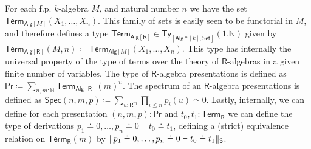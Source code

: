 \documentclass[10pt,a4paper]{article}
\newcommand{\nats}{\mathbb{N}}
\newcommand{\Set}{\mathsf{Set}}
\newcommand{\Alg}{\mathsf{Alg}}
\newcommand\Ty{\mathsf{Ty}}
\newcommand\R{\mathsf{R}}
\newcommand\Spec{\mathsf{Spec}}
\renewcommand\Pr{\mathsf{Pr}}
\newcommand\Term{\mathsf{Term}}
\begin{document}
For each f.p. \(k\)-algebra \(M\), and natural number \(n\) we have the set \(\Term_{\Alg[M]}(X_1, \ldots, X_n)\).
This family of sets is easily seen to be functorial in \(M\), and therefore defines a type \(\Term_{\Alg[\R]} \in \Ty_{[\Alg*[k], \Set]}(1.\nats)\) given by \(\Term_{\Alg[\R]}(M, n) \coloneqq \Term_{\Alg[M]}(X_1, \ldots, X_n)\).
This type has internally the universal property of the type of terms over the theory of \(\R\)-algebras in a given finite number of variables.
The type of \(\R\)-algebra presentations is defined as \(\Pr \coloneqq \sum_{n, m \colon \nats} \Term_{\Alg[\R]}(m)^n\). 
The spectrum of an \(\R\)-algebra presentations is defined as \(\Spec(n, m, p) \coloneqq \sum_{ u \colon \R^{m} } \prod_{i \leq n} p_i(u) \simeq 0\).
Lastly, internally, we can define for each presentation \((n, m, p) \colon \Pr\) and \(t_0, t_1 \colon \Term_{\R}\) we can define the type of derivations \(p_1 \doteq 0, \ldots, p_n \doteq 0 \vdash t_0 \doteq t_1\), defining a (strict) equivalence relation on \(\Term_{\R}(m)\) by \(\trunc*{p_1 \doteq 0, \ldots, p_n \doteq 0 \vdash t_0 \doteq t_1}\).

\end{document}
